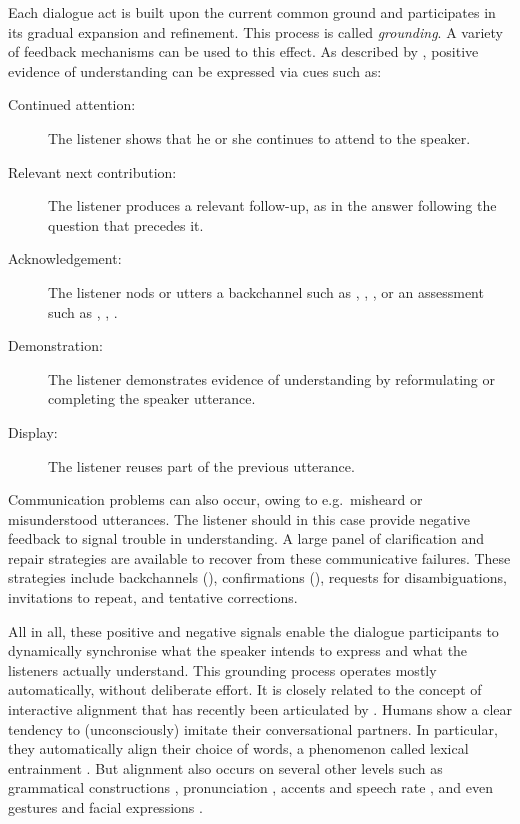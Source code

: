 Each dialogue act is built upon the current common ground and participates in its gradual expansion and refinement.  This process is called \textit{grounding}.  A variety of feedback mechanisms  can be used to this effect.  As described by \cite{Clark1989}, positive evidence of understanding can be expressed via cues such as:
\begin{description}
\item[Continued attention: ] The listener shows that he or she continues to attend to the speaker.
\item[Relevant next contribution: ] The listener produces a relevant follow-up, as in the answer  following the question that precedes it.
\item [Acknowledgement: ] The listener nods or utters a backchannel such as , , , or an assessment such as , , .
\item [Demonstration: ] The listener demonstrates evidence of understanding by reformulating or completing the speaker utterance.
\item [Display: ] The listener reuses part of the previous utterance.
\end{description}

Communication problems can also occur, owing to e.g.\ misheard or misunderstood utterances. The listener should in this case provide negative feedback to signal trouble in understanding. A large panel of clarification and repair strategies  are available to recover from these communicative failures.  These strategies include backchannels (), confirmations  (), requests for disambiguations, invitations to repeat, and tentative corrections.  

All in all, these positive and negative signals enable the dialogue participants to dynamically synchronise what the speaker intends to express and what the listeners actually understand.   This grounding process operates mostly automatically, without deliberate effort.  It is closely related to the concept of interactive alignment that has recently been articulated by \cite{Garrod2004,Garrod2009}. Humans show a clear tendency to (unconsciously) imitate their conversational partners. In particular, they automatically align their choice of words, a phenomenon called lexical entrainment \citep{brennan1996conceptual}.  But alignment also occurs on several other levels such as grammatical constructions \citep{branigan2000syntactic}, pronunciation \citep{pardo2006phonetic}, accents and speech rate \citep{giles19911}, and even gestures and facial expressions \citep{bavelas1986show}.

